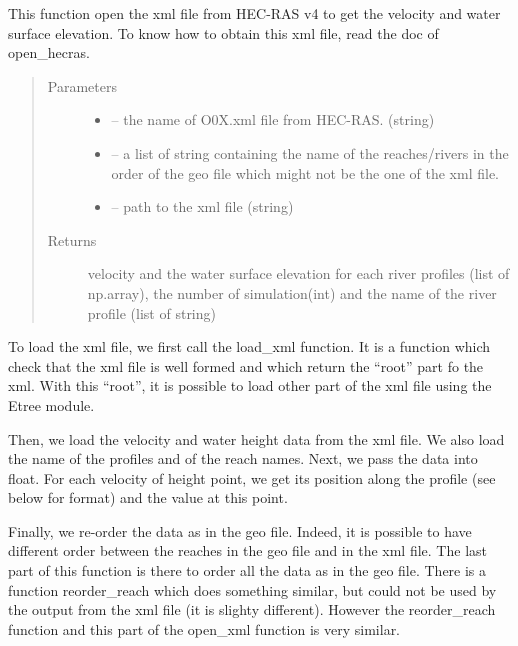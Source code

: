 \documentclass[letterpaper,10pt,english]{sphinxmanual}
\begin{document}

\begin{fulllineitems}
\label{\detokenize{index:src.Hec_ras06.open_xmlfile}}
This function open the xml file from HEC-RAS v4 to get the velocity and water surface elevation. To know how to
obtain this xml file, read the doc of open\_hecras.
\begin{quote}\begin{description}
\item[{Parameters}] \leavevmode\begin{itemize}
\item {} 
 -- the name of O0X.xml file from HEC-RAS. (string)

\item {} 
 -- a list of string containing the name of the reaches/rivers in the order of the geo file
which might not be the one of the xml file.

\item {} 
 -- path to the xml file (string)

\end{itemize}

\item[{Returns}] \leavevmode
velocity and the water surface elevation for each river profiles (list of np.array),
the number of simulation(int) and the name of the river profile (list of string)

\end{description}\end{quote}


To load the xml file, we first call the load\_xml function. It is a function which check that the xml file is well
formed and which return the “root” part fo the xml. With this “root”, it is possible to load other part of the xml
file using the Etree module.

Then, we load the velocity and water height data from the xml file. We also load the name of the profiles and of
the reach names.  Next, we pass the data into float. For each velocity of height point, we get its position along
the profile (see below for format) and the value at this point.

Finally, we re-order the data as in the geo file. Indeed, it is possible to have different order between the reaches
in the geo file and in the xml file. The last part of this function is there to order all the data as in the geo
file. There is a function reorder\_reach which does something similar, but could not be used by the output from the
xml file (it is slighty different). However the reorder\_reach function and this part of the open\_xml function is
very similar.

\end{fulllineitems}
\end{document}

